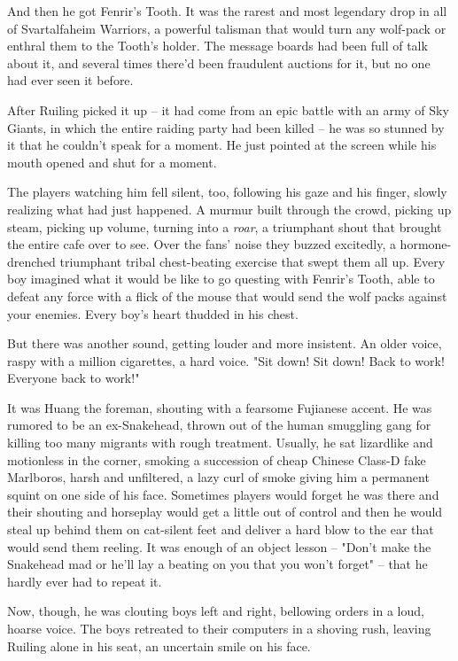 And then he got Fenrir's Tooth. It was the rarest and most
legendary drop in all of Svartalfaheim Warriors, a powerful
talisman that would turn any wolf-pack or enthral them to the
Tooth's holder. The message boards had been full of talk about it,
and several times there'd been fraudulent auctions for it, but no
one had ever seen it before.

After Ruiling picked it up -- it had come from an epic battle with
an army of Sky Giants, in which the entire raiding party had been
killed -- he was so stunned by it that he couldn't speak for a
moment. He just pointed at the screen while his mouth opened and
shut for a moment.

The players watching him fell silent, too, following his gaze and
his finger, slowly realizing what had just happened. A murmur built
through the crowd, picking up steam, picking up volume, turning
into a \emph{roar}, a triumphant shout that brought the entire cafe
over to see. Over the fans' noise they buzzed excitedly, a
hormone-drenched triumphant tribal chest-beating exercise that
swept them all up. Every boy imagined what it would be like to go
questing with Fenrir's Tooth, able to defeat any force with a flick
of the mouse that would send the wolf packs against your enemies.
Every boy's heart thudded in his chest.

But there was another sound, getting louder and more insistent. An
older voice, raspy with a million cigarettes, a hard voice. "Sit
down! Sit down! Back to work! Everyone back to work!"

It was Huang the foreman, shouting with a fearsome Fujianese
accent. He was rumored to be an ex-Snakehead, thrown out of the
human smuggling gang for killing too many migrants with rough
treatment. Usually, he sat lizardlike and motionless in the corner,
smoking a succession of cheap Chinese Class-D fake Marlboros, harsh
and unfiltered, a lazy curl of smoke giving him a permanent squint
on one side of his face. Sometimes players would forget he was
there and their shouting and horseplay would get a little out of
control and then he would steal up behind them on cat-silent feet
and deliver a hard blow to the ear that would send them reeling. It
was enough of an object lesson -- "Don't make the Snakehead mad or
he'll lay a beating on you that you won't forget" -- that he hardly
ever had to repeat it.

Now, though, he was clouting boys left and right, bellowing orders
in a loud, hoarse voice. The boys retreated to their computers in a
shoving rush, leaving Ruiling alone in his seat, an uncertain smile
on his face.

